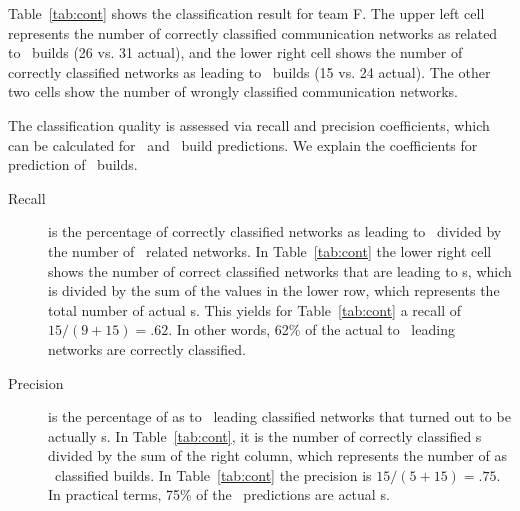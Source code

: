 Table~\ref{tab:cont} shows the classification result for team F. The upper left
cell represents the number of correctly classified communication networks as
related to \ok\ builds (26 vs. 31 actual), and the lower right cell shows the
number of correctly classified networks as leading to \error\ builds (15 vs. 24
actual). The other two cells show the number of wrongly classified communication
networks.

The classification quality is assessed via recall and precision coefficients,
which can be calculated for \error\ and \ok\ build  predictions. We explain the
coefficients for prediction of \error\ builds.

\begin{description}
\item[Recall] is the percentage of correctly classified networks as leading to
\error\ divided by the number of \error\ related networks. In
Table~\ref{tab:cont} the lower right cell shows the number of correct classified
networks that are leading to \error s, which is divided by the sum of the values
in the lower row, which represents the total number of actual \error s. This
yields for Table~\ref{tab:cont} a recall of $15/(9+15)=.62$. In other words,
62\% of the actual to \error\ leading networks are correctly classified.
 
\item[Precision] is the percentage of as to \error\ leading classified networks
that turned out to be actually \error s. In Table~\ref{tab:cont}, it is the
number of correctly classified \error s divided by the sum of the right column,
which represents the number of as \error\ classified builds. In
Table~\ref{tab:cont} the precision is $15/(5+15)=.75$. In practical terms, 75\%
of the \error\ predictions are actual \error s.
\end{description}





